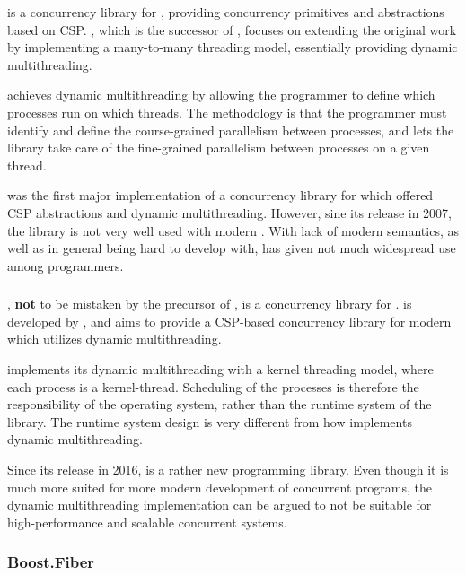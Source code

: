  \citep{brown2007c++csp2} is a concurrency library for \Cpp, providing concurrency primitives and abstractions based on CSP. , which is the successor of \Cppcsp{} \citep{brown2003c++csp}, focuses on extending the original work by implementing a many\hyp{}to\hyp{}many threading model, essentially providing dynamic multithreading.

 achieves dynamic multithreading by allowing the programmer to define which processes run on which threads. The methodology is that the programmer must identify and define the course\hyp{}grained parallelism between processes, and lets the library take care of the fine\hyp{}grained parallelism between processes on a given thread.

 was the first major implementation of a concurrency library for \Cpp{} which offered CSP abstractions and dynamic multithreading. However, sine its release in 2007, the library is not very well used with modern \Cpp{}. With lack of modern \Cpp{} semantics, as well as in general being hard to develop with, has given  not much widespread use among \Cpp{} programmers.


\subsubsection{\Cppcsp{}}


\Cppcsp{}, \textbf{not} to be mistaken by the precursor of , is a concurrency library for \Cpp{}. \Cppcsp{} is developed by \citet{chalmers2016cppcsp}, and aims to provide a CSP\hyp{}based concurrency library for modern \Cpp{} which utilizes dynamic multithreading.

\Cppcsp{} implements its dynamic multithreading with a kernel threading model, where each process is a kernel\hyp{}thread. Scheduling of the processes is therefore the responsibility of the operating system, rather than the runtime system of the library. The runtime system design is very different from how  implements dynamic multithreading.

Since its release in 2016, \Cppcsp{} is a rather new programming library. Even though it is much more suited for more modern development of concurrent \Cpp{} programs, the dynamic multithreading implementation can be argued to not be suitable for high\hyp{}performance and scalable concurrent systems.


\subsubsection{Boost.Fiber}


